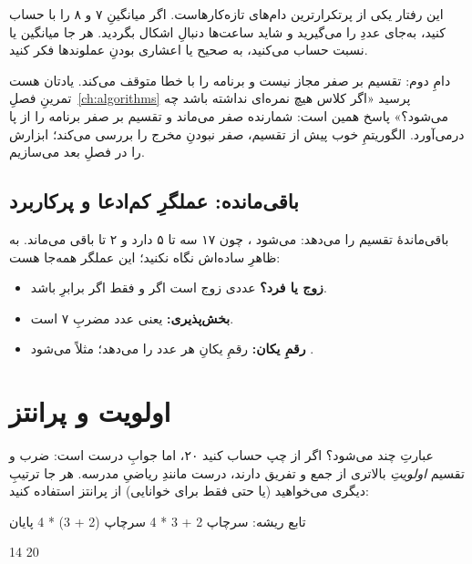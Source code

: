 \begin{warn}
این رفتار یکی از پرتکرارترین دام‌های تازه‌کارهاست. اگر میانگینِ ۷ و ۸ را با
 حساب کنید، به‌جای  عددِ  را می‌گیرید و
شاید ساعت‌ها دنبالِ اشکال بگردید. هر جا میانگین یا نسبت حساب می‌کنید، به
صحیح یا اعشاری بودنِ عملوندها فکر کنید.

دامِ دوم: تقسیم بر صفر مجاز نیست و برنامه را با خطا متوقف می‌کند. یادتان
هست تمرینِ فصلِ~\ref{ch:algorithms} پرسید «اگر کلاس هیچ نمره‌ای نداشته
باشد چه می‌شود؟» پاسخ همین است: شمارنده صفر می‌ماند و تقسیم بر صفر برنامه
را از پا درمی‌آورد. الگوریتمِ خوب پیش از تقسیم، صفر نبودنِ مخرج را بررسی
می‌کند؛ ابزارش را در فصلِ بعد می‌سازیم.
\end{warn}

\subsection{باقی‌مانده: عملگرِ کم‌ادعا و پرکاربرد}

\code{\%} باقی‌ماندهٔ تقسیم را می‌دهد:  می‌شود ، چون
۱۷ سه تا ۵ دارد و ۲ تا باقی می‌ماند. به ظاهرِ ساده‌اش نگاه نکنید؛ این عملگر
همه‌جا هست:

\begin{itemize}
  \item \textbf{زوج یا فرد؟} عددی زوج است اگر و فقط اگر
         برابرِ  باشد.
  \item \textbf{بخش‌پذیری:}  یعنی عدد مضربِ ۷ است.
  \item \textbf{رقمِ یکان:}  رقمِ یکانِ هر عدد را می‌دهد؛
        مثلاً  می‌شود .
\end{itemize}

\section{اولویت و پرانتز}

عبارتِ  چند می‌شود؟ اگر از چپ حساب کنید ۲۰، اما جوابِ درست
 است: ضرب و تقسیم \emph{اولویتِ} بالاتری از جمع و تفریق دارند،
درست مانندِ ریاضیِ مدرسه. هر جا ترتیبِ دیگری می‌خواهید (یا حتی فقط برای
خوانایی) از پرانتز استفاده کنید:

\begin{salamfa}
تابع ریشه:
    سرچاپ 2 + 3 * 4
    سرچاپ (2 + 3) * 4
پایان
\end{salamfa}

\begin{progout}
14
20
\end{progout}

